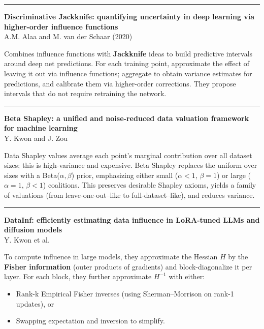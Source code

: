 \documentclass[a5paper]{article}
\providecommand{\tightlist}{%
  \setlength{\itemsep}{0pt}\setlength{\parskip}{0pt}}
\begin{document}
\begin{center}\rule{0.5\linewidth}{0.5pt}\end{center}

\textbf{Discriminative Jackknife: quantifying uncertainty in deep
learning via higher-order influence functions}\\
A.M. Alaa and M. van der Schaar (2020)

Combines influence functions with \textbf{Jackknife} ideas to build
predictive intervals around deep net predictions. For each training
point, approximate the effect of leaving it out via influence functions;
aggregate to obtain variance estimates for predictions, and calibrate
them via higher-order corrections. They propose intervals that do not
require retraining the network.

\begin{center}\rule{0.5\linewidth}{0.5pt}\end{center}

\textbf{Beta Shapley: a unified and noise-reduced data valuation
framework for machine learning}\\
Y. Kwon and J. Zou

Data Shapley values average each point's marginal contribution over all
dataset sizes; this is high-variance and expensive. Beta Shapley
replaces the uniform over sizes with a Beta($\alpha,\beta$) prior,
emphasizing either small ($\alpha<1$, $\beta=1$) or large ($\alpha=1$, $\beta<1$)
coalitions. This preserves desirable Shapley axioms, yields a family of
valuations (from leave-one-out--like to full-dataset--like), and reduces
variance.

\begin{center}\rule{0.5\linewidth}{0.5pt}\end{center}

\textbf{DataInf: efficiently estimating data influence in LoRA-tuned
LLMs and diffusion models}\\
Y. Kwon et al.

To compute influence in large models, they approximate the Hessian $H$ by
the \textbf{Fisher information} (outer products of gradients) and
block-diagonalize it per layer. For each block, they further approximate
$H^{-1}$ with either:

\begin{itemize}
\tightlist
\item
  Rank-k Empirical Fisher inverses (using Sherman--Morrison on rank-1
  updates), or
\item
  Swapping expectation and inversion to simplify.
\end{itemize}
\end{document}
